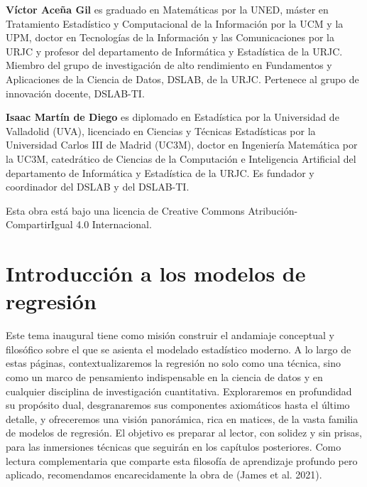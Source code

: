 \documentclass[
  letterpaper,
  DIV=11,
  numbers=noendperiod]{scrreprt}
\begin{document}
\begin{tcolorbox}[enhanced jigsaw, breakable, toprule=.15mm, bottomtitle=1mm, coltitle=black, colbacktitle=quarto-callout-note-color!10!white, titlerule=0mm, opacitybacktitle=0.6, bottomrule=.15mm, toptitle=1mm, title=\textcolor{quarto-callout-note-color}{\faInfo}\hspace{0.5em}{Sobre los autores}, arc=.35mm, rightrule=.15mm, opacityback=0, colframe=quarto-callout-note-color-frame, leftrule=.75mm, left=2mm, colback=white]

\textbf{Víctor Aceña Gil} es graduado en Matemáticas por la UNED, máster
en Tratamiento Estadístico y Computacional de la Información por la UCM
y la UPM, doctor en Tecnologías de la Información y las Comunicaciones
por la URJC y profesor del departamento de Informática y Estadística de
la URJC. Miembro del grupo de investigación de alto rendimiento en
Fundamentos y Aplicaciones de la Ciencia de Datos, DSLAB, de la URJC.
Pertenece al grupo de innovación docente, DSLAB-TI.

\textbf{Isaac Martín de Diego} es diplomado en Estadística por la
Universidad de Valladolid (UVA), licenciado en Ciencias y Técnicas
Estadísticas por la Universidad Carlos III de Madrid (UC3M), doctor en
Ingeniería Matemática por la UC3M, catedrático de Ciencias de la
Computación e Inteligencia Artificial del departamento de Informática y
Estadística de la URJC. Es fundador y coordinador del DSLAB y del
DSLAB-TI.

\end{tcolorbox}

Esta obra está bajo una licencia de Creative Commons
Atribución-CompartirIgual 4.0 Internacional.


\chapter{Introducción a los modelos de regresión}\label{sec-intro}

Este tema inaugural tiene como misión construir el andamiaje conceptual
y filosófico sobre el que se asienta el modelado estadístico moderno. A
lo largo de estas páginas, contextualizaremos la regresión no solo como
una técnica, sino como un marco de pensamiento indispensable en la
ciencia de datos y en cualquier disciplina de investigación
cuantitativa. Exploraremos en profundidad su propósito dual,
desgranaremos sus componentes axiomáticos hasta el último detalle, y
ofreceremos una visión panorámica, rica en matices, de la vasta familia
de modelos de regresión. El objetivo es preparar al lector, con solidez
y sin prisas, para las inmersiones técnicas que seguirán en los
capítulos posteriores. Como lectura complementaria que comparte esta
filosofía de aprendizaje profundo pero aplicado, recomendamos
encarecidamente la obra de (James et al. 2021).
\end{document}

